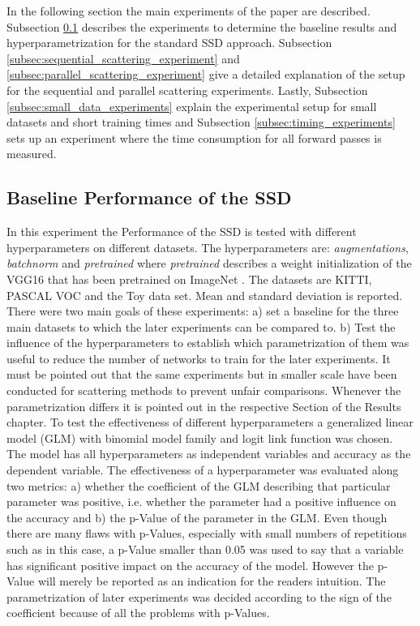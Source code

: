 In the following section the main experiments of the paper are described. Subsection \ref{subsec:baseline_SSD} describes the experiments to determine the baseline results and hyperparametrization for the standard SSD approach. Subsection \ref{subsec:sequential_scattering_experiment} and \ref{subsec:parallel_scattering_experiment} give a detailed explanation of the setup for the sequential and parallel scattering experiments. Lastly, Subsection \ref{subsec:small_data_experiments} explain the experimental setup for small datasets and short training times and Subsection \ref{subsec:timing_experiments} sets up an experiment where the time consumption for all forward passes is measured. 

\subsection{Baseline Performance of the SSD}
\label{subsec:baseline_SSD}

In this experiment the Performance of the SSD is tested with different hyperparameters on different datasets. The hyperparameters are: \textit{augmentations}, \textit{batchnorm} and \textit{pretrained} where \textit{pretrained} describes a weight initialization of the VGG16 that has been pretrained on ImageNet \cite{imagenet_cvpr09}. The datasets are KITTI, PASCAL VOC and the Toy data set. Mean and standard deviation is reported. There were two main goals of these experiments: a) set a baseline for the three main datasets to which the later experiments can be compared to.  b) Test the influence of the hyperparameters to establish which parametrization of them was useful to reduce the number of networks to train for the later experiments. It must be pointed out that the same experiments but in smaller scale have been conducted for scattering methods to prevent unfair comparisons. Whenever the parametrization differs it is pointed out in the respective Section of the Results chapter. 
To test the effectiveness of different hyperparameters a generalized linear model (GLM) with binomial model family and logit link function was chosen. The model has all hyperparameters as independent variables and accuracy as the dependent variable. The effectiveness of a hyperparameter was evaluated along two metrics: a) whether the coefficient of the GLM describing that particular parameter was positive, i.e. whether the parameter had a positive influence on the accuracy and b) the p-Value of the parameter in the GLM. Even though there are many flaws with p-Values, especially with small numbers of repetitions such as in this case, a p-Value smaller than 0.05 was used to say that a variable has significant positive impact on the accuracy of the model. However the p-Value will merely be reported as an indication for the readers intuition. The parametrization of later experiments was decided according to the sign of the coefficient because of all the problems with p-Values.

